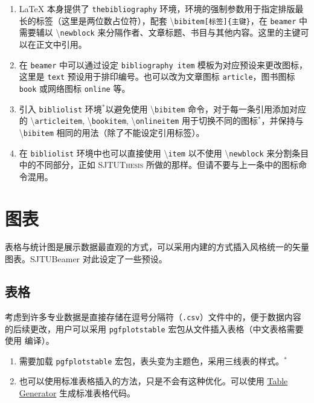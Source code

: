 \documentclass[
    UTF8,
    heading=true,
    12pt,
    a4paper
]{ctexrep}
\newenvironment{commentlist}{\begin{enumerate}\small}{\end{enumerate}}
\newcommand{\cmd}[1]{\textbackslash{}\texttt{#1}}
\newcommand{\cls}[1]{\texttt{#1}}
\newcommand{\env}[1]{\texttt{#1}}
\newcommand{\pkg}[1]{\texttt{#1}}
\newcommand{\opt}[1]{\texttt{#1}}
\def\themename{\textsf{SJTUBeamer}}
\begin{document}

\begin{commentlist}
  \item \LaTeX{} 本身提供了 \env{thebibliography} 环境，环境的强制参数用于指定排版最长的标签（这里是两位数占位符），配套 \cmd{bibitem[标签]\{主键\}}，在 \cls{beamer} 中需要辅以 \cmd{newblock} 来分隔作者、文章标题、书目与其他内容。这里的主键可以在正文中引用。
  \item 在 \cls{beamer} 中可以通过设定 \opt{bibliography item} 模板为对应预设来更改图标，这里是 \opt{text} 预设用于排印编号。也可以改为文章图标 \opt{article}，图书图标 \opt{book} 或网络图标 \opt{online} 等。
  \item 引入 \env{bibliolist} 环境$^*$以避免使用 \cmd{bibitem} 命令，对于每一条引用添加对应的 \cmd{articleitem}, \cmd{bookitem}, \cmd{onlineitem} 用于切换不同的图标$^*$，并保持与 \cmd{bibitem} 相同的用法（除了不能设定引用标签）。
  \item 在 \env{bibliolist} 环境中也可以直接使用 \cmd{item} 以不使用 \cmd{newblock} 来分割条目中的不同部分，正如 \textsc{SJTUThesis} 所做的那样。但请不要与上一条中的图标命令混用。
\end{commentlist}

\chapter{图表}

表格与统计图是展示数据最直观的方式，可以采用内建的方式插入风格统一的矢量图表。\themename{} 对此设定了一些预设。

\section{表格}

考虑到许多专业数据是直接存储在逗号分隔符（\texttt{.csv}）文件中的，便于数据内容的后续更改，用户可以采用 \pkg{pgfplotstable} 宏包从文件插入表格（中文表格需要使用  编译）。


\begin{commentlist}
  \item 需要加载 \pkg{pgfplotstable} 宏包，表头变为主题色，采用三线表的样式。$^*$
  \item 也可以使用标准表格插入的方法，只是不会有这种优化。可以使用 \href{https://www.tablesgenerator.com/latex_tables}{Table Generator} 生成标准表格代码。
\end{commentlist}
\end{document}
